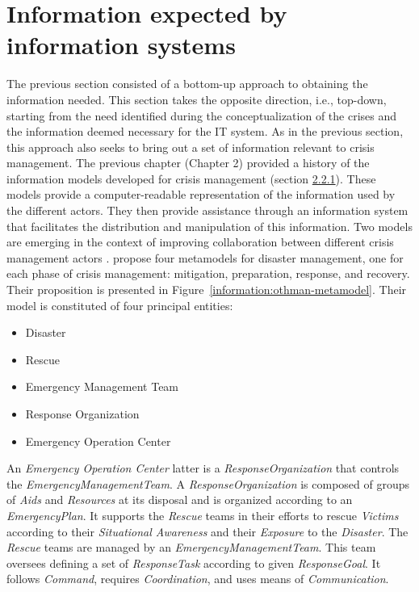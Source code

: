 \section{Information expected by information systems}
\label{sec:crisismetamodel}
The previous section consisted of a bottom-up approach to obtaining the information needed.
This section takes the opposite direction, i.e., top-down, starting from the need identified during the conceptualization of the crises and the information deemed necessary for the IT system.
As in the previous section, this approach also seeks to bring out a set of information relevant to crisis management.
The previous chapter (Chapter 2) provided a history of the information models developed for crisis management (section \hyperref[sec:lit-information-models]{2.2.1}).
These models provide a computer-readable representation of the information used by the different actors.
They then provide assistance through an information system that facilitates the distribution and manipulation of this information.
Two models are emerging in the context of improving collaboration between different crisis management actors \parencite{othmanDevelopmentValidationDisaster2014,benabenMetamodelItsOntology2008}.
\textcite{othmanDevelopmentValidationDisaster2014} propose four metamodels for disaster management, one for each phase of crisis management: mitigation, preparation, response, and recovery.
Their proposition is presented in Figure~\ref{information:othman-metamodel}.
Their model is constituted of four principal entities:

\begin{itemize}
    \item Disaster
    \item Rescue
    \item Emergency Management Team
    \item Response Organization
    \item Emergency Operation Center
\end{itemize}

An \textit{Emergency Operation Center} latter is a \textit{ResponseOrganization} that controls the \textit{EmergencyManagementTeam}.
A \textit{ResponseOrganization} is composed of groups of \textit{Aids} and \textit{Resources} at its disposal and is organized according to an \textit{EmergencyPlan}.
It supports the \textit{Rescue} teams in their efforts to rescue \textit{Victims} according to their \textit{Situational Awareness} and their \textit{Exposure} to the \textit{Disaster}.
The \textit{Rescue} teams are managed by an \textit{EmergencyManagementTeam}.
This team oversees defining a set of \textit{ResponseTask} according to given \textit{ResponseGoal}.
It follows \textit{Command}, requires \textit{Coordination}, and uses means of \textit{Communication}.

